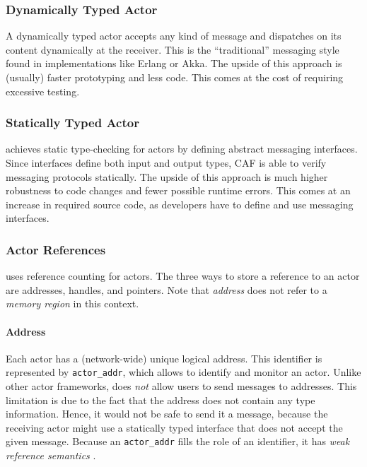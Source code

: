 \subsubsection{Dynamically Typed Actor}

A dynamically typed actor accepts any kind of message and dispatches on its content dynamically at the receiver.
This is the ``traditional'' messaging style found in implementations like Erlang or Akka.
The upside of this approach is (usually) faster prototyping and less code.
This comes at the cost of requiring excessive testing.

\subsubsection{Statically Typed Actor}

\lib achieves static type-checking for actors by defining abstract messaging interfaces.
Since interfaces define both input and output types, CAF is able to verify messaging protocols statically.
The upside of this approach is much higher robustness to code changes and fewer possible runtime errors.
This comes at an increase in required source code, as developers have to define and use messaging interfaces.

\subsubsection{Actor References}
\label{actor-reference}

\lib uses reference counting for actors. The three ways to store a reference to an actor are addresses, handles, and pointers. Note that \emph{address} does not refer to a \emph{memory region} in this context.

\paragraph{Address}
\label{actor-address}

Each actor has a (network-wide) unique logical address. This identifier is represented by \lstinline^actor_addr^, which allows to identify and monitor an actor.
Unlike other actor frameworks, \lib does \emph{not} allow users to send messages to addresses.
This limitation is due to the fact that the address does not contain any type information.
Hence, it would not be safe to send it a message, because the receiving actor might use a statically typed interface that does not accept the given message. Because an \lstinline^actor_addr^ fills the role of an identifier, it has \emph{weak reference semantics} .


